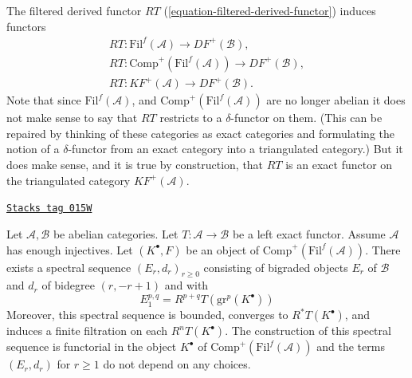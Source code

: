 \medskip\noindent
The filtered derived functor $RT$ (\ref{equation-filtered-derived-functor})
induces functors
$$
\begin{matrix}
RT : \text{Fil}^f(\mathcal{A}) \to DF^{+}(\mathcal{B}), \\
RT : \text{Comp}^{+}(\text{Fil}^f(\mathcal{A})) \to DF^{+}(\mathcal{B}), \\
RT : KF^{+}(\mathcal{A}) \to DF^{+}(\mathcal{B}).
\end{matrix}
$$
Note that since $\text{Fil}^f(\mathcal{A})$, and
$\text{Comp}^{+}(\text{Fil}^f(\mathcal{A}))$ are no longer
abelian it does not make sense to say that $RT$ restricts to
a $\delta$-functor on them. (This can be
repaired by thinking of these categories as exact categories and
formulating the notion of a $\delta$-functor from an exact category
into a triangulated category.)
But it does make sense, and it is true
by construction, that $RT$ is an exact functor on the triangulated
category $KF^{+}(\mathcal{A})$.

\begin{lemma}
\label{derived-lemma-ss-filtered-derived}
\href{https://stacks.math.columbia.edu/tag/015W}{\texttt{Stacks tag 015W}}

Let $\mathcal{A}, \mathcal{B}$ be abelian categories. Let
$T : \mathcal{A} \to \mathcal{B}$ be a left exact functor.
Assume $\mathcal{A}$ has enough injectives.
Let $(K^\bullet, F)$ be an object of
$\text{Comp}^{+}(\text{Fil}^f(\mathcal{A}))$.
There exists a spectral sequence $(E_r, d_r)_{r\geq 0}$
consisting of bigraded objects $E_r$ of $\mathcal{B}$
and $d_r$ of bidegree $(r, - r + 1)$ and with
$$
E_1^{p, q} = R^{p + q}T(\text{gr}^p(K^\bullet))
$$
Moreover, this spectral sequence is bounded, converges
to $R^*T(K^\bullet)$, and induces a finite
filtration on each $R^nT(K^\bullet)$. The construction
of this spectral sequence is functorial in the object
$K^\bullet$ of $\text{Comp}^{+}(\text{Fil}^f(\mathcal{A}))$
and the terms $(E_r, d_r)$ for $r \geq 1$ do not depend
on any choices.
\end{lemma}

